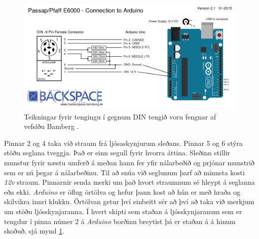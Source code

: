 \begin{figure}[H] %
    \centering
    \includegraphics[width=0.75\linewidth]{myndir/bambergDIN6.png}
    \caption{Teikningar fyrir tengingu í gegnum DIN tengið voru fengnar af vefsíðu Bamberg \cite{bamberg}. }
    \label{fig:bambergDIN6}
\end{figure}
Pinnar 2 og 4 taka við straum frá ljósaskynjurum sleðans. Pinnar 5 og 6 stýra stöðu seglana tveggja. 
Það er einn segull fyrir hvorra áttina. Sleðinn stillir munstur fyrir næstu umferð á meðan hann fer yfir nálarbeðið og prjónar  munstrið sem er nú þegar á nálarbeðinu. Til að snúa við seglunum þarf að minnsta kosti \textit{12v} straum. Pinnarnir senda merki um það hvort straumnum sé hleypt á seglanna eða ekki. \textit{Arduino} er öflug örtölva og hefur þann kost að hún er með hraða og skilvikra innri klukku. Örtölvan getur því einbeitt sér að því að taka við merkjum um stöðu ljósskynjaranna. 
Í hvert skipti sem staðan á ljósskynjaranum sem er tengdur í pinna númer 2 á \textit{Arduino} borðinu breytist þá er staðan á á hinum skoðuð, sjá mynd \ref{fig:bambergDIN6}.

